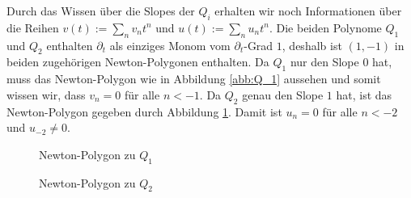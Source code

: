 Durch das Wissen über die Slopes der $Q_i$ erhalten wir noch Informationen über
die Reihen $v(t):=\sum_n v_nt^n$ und $u(t):=\sum_n u_nt^n$. Die beiden Polynome
$Q_1$ und $Q_2$ enthalten $\partial_t$ als einziges Monom vom $\partial_t$-Grad
$1$, deshalb ist $(1,-1)$ in beiden zugehörigen Newton-Polygonen enthalten.
Da $Q_1$ nur den Slope $0$ hat, muss das Newton-Polygon wie in Abbildung
\ref{abb:Q_1} aussehen und somit wissen wir, dass $v_n=0$ für alle $n<-1$.
Da $Q_2$ genau den Slope $1$ hat, ist das Newton-Polygon gegeben durch
Abbildung \ref{abb:Q_2}. Damit ist $u_n=0$ für alle $n<-2$ und $u_{-2}\neq0$.
\begin{figure}[htbp]
  \begin{minipage}[hbt]{0,49\textwidth}
  \begin{center}
  \end{center}
  \caption{Newton-Polygon zu $Q_1$}
  \label{abb:Q_1}
  \end{minipage}
  \begin{minipage}[hbt]{0,49\textwidth}
  \begin{center}
  \end{center}
  \caption{Newton-Polygon zu $Q_2$}
  \label{abb:Q_2}
  \end{minipage}
\end{figure}

